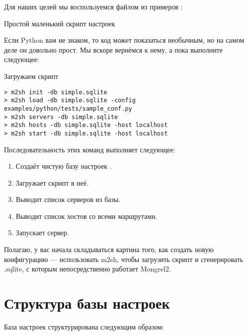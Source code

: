 Для наших целей мы воспользуемся файлом из
примеров :

\begin{code}{Простой маленький скрипт настроек}
  
\end{code}

Если Python вам не знаком, то код может показаться необычным, но на
самом деле он довольно прост. Мы вскоре вернёмся к нему, а пока
выполните следующее:

\begin{code}{Загружаем скрипт}
\begin{lstlisting}
> m2sh init -db simple.sqlite
> m2sh load -db simple.sqlite -config examples/python/tests/sample_conf.py
> m2sh servers -db simple.sqlite
> m2sh hosts -db simple.sqlite -host localhost
> m2sh start -db simple.sqlite -host localhost
\end{lstlisting}
\end{code}

Последовательность этих команд выполняет следующее:

\begin{enumerate}
\item Создаёт чистую базу настроек .
\item Загружает скрипт  в неё.
\item Выводит список серверов из базы.
\item Выводит список хостов со всеми маршрутами.
\item Запускает сервер.
\end{enumerate}

Полагаю, у вас начала складываться картина того, как создать новую
конфигурацию --- использовать m2sh, чтобы загрузить скрипт и
сгенерировать .sqlite, с которым непосредственно работает Mongrel2.

\section{Структура базы настроек}

База настроек структурирована следующим образом:

